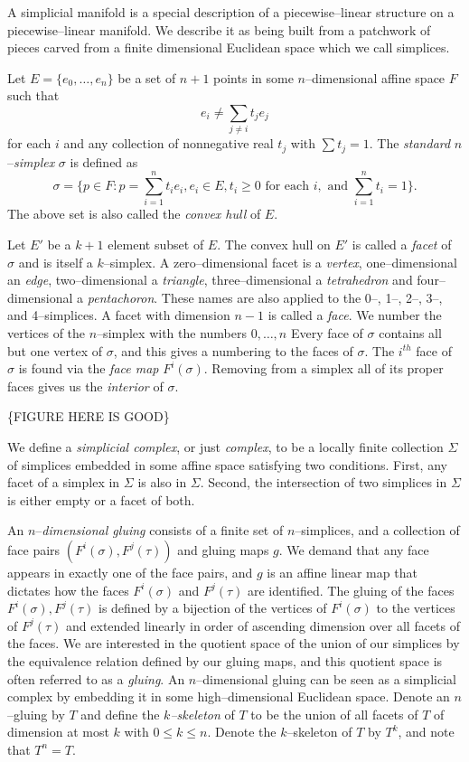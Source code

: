 A simplicial manifold is a special description of a piecewise--linear structure on a piecewise--linear manifold.
We describe it as being built from a patchwork of pieces carved from a finite dimensional Euclidean space which we call simplices.

Let $E=\{e_0,\dots,e_n\}$ be a set of $n+1$ points in some $n$--dimensional affine space $F$ such that
\[
  e_i\neq \sum_{j\neq i}t_j e_j
\]
for each $i$ and any collection of nonnegative real $t_j$ with $\sum t_j=1$.
The \emph{standard} $n$--\emph{simplex} $\sigma$ is defined as
\[
  \sigma = \{p\in F : p = \sum_{i=1}^n t_i e_i , e_i\in E, t_i\geq 0\text{ for each }i,\text{ and }\sum_{i=1}^n t_i=1\}.
\]
The above set is also called the \emph{convex hull} of $E$.

Let $E'$ be a $k+1$ element subset of $E$.
The convex hull on $E'$ is called a \emph{facet} of $\sigma$ and is itself a $k$--simplex.
A zero--dimensional facet is a \emph{vertex}, one--dimensional an \emph{edge}, two--dimensional a \emph{triangle}, three--dimensional a \emph{tetrahedron} and four--dimensional a \emph{pentachoron}.
These names are also applied to the 0--, 1--, 2--, 3--, and 4--simplices.
A facet with dimension $n-1$ is called a \emph{face}.
We number the vertices of the $n$--simplex with the numbers $0,\dots,n$
Every face of $\sigma$ contains all but one vertex of $\sigma$, and this gives a numbering to the faces of $\sigma$.
The $i^{th}$ face of $\sigma$ is found via the \emph{face map} $F^i(\sigma)$.
Removing from a simplex all of its proper faces gives us the \emph{interior} of $\sigma$.

\{FIGURE HERE IS GOOD\}

We define a \emph{simplicial complex}, or just \emph{complex}, to be a locally finite collection $\Sigma$ of simplices embedded in some affine space satisfying two conditions.
First, any facet of a simplex in $\Sigma$ is also in $\Sigma$.
Second, the intersection of two simplices in $\Sigma$ is either empty or a facet of both.

An $n$--\emph{dimensional gluing} consists of a finite set of $n$--simplices, and a collection of face pairs $(F^i(\sigma),F^j(\tau))$ and gluing maps $g$.
We demand that any face appears in exactly one of the face pairs, and $g$ is an affine linear map that dictates how the faces $F^i(\sigma)$ and $F^j(\tau)$ are identified.
The gluing of the faces $F^i(\sigma),F^j(\tau)$ is defined by a bijection of the vertices of $F^i(\sigma)$ to the vertices of $F^j(\tau)$ and extended linearly in order of ascending dimension over all facets of the faces.
We are interested in the quotient space of the union of our simplices by the equivalence relation defined by our gluing maps, and this quotient space is often referred to as a \emph{gluing}.
An $n$--dimensional gluing can be seen as a simplicial complex by embedding it in some high--dimensional Euclidean space.
Denote an $n$--gluing by $T$ and define the \emph{$k$--skeleton} of $T$ to be the union of all facets of $T$ of dimension at most $k$ with $0\leq k\leq n$.
Denote the $k$--skeleton of $T$ by $T^k$, and note that $T^n=T$.

